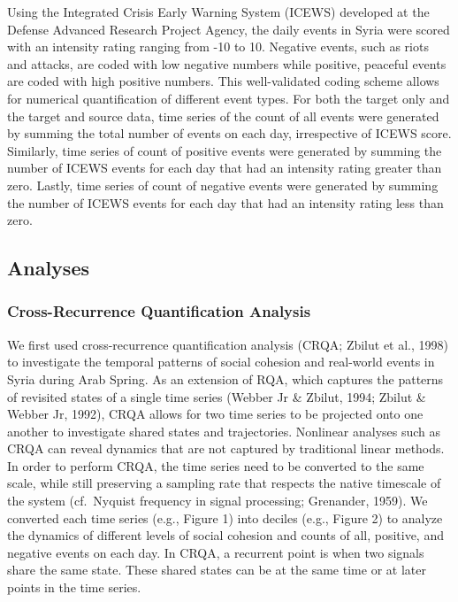 \documentclass[english,man]{apa6}
\begin{document}
Using the Integrated Crisis Early Warning System (ICEWS) developed at the Defense Advanced Research Project Agency, the daily events in Syria were scored with an intensity rating ranging from -10 to 10. Negative events, such as riots and attacks, are coded with low negative numbers while positive, peaceful events are coded with high positive numbers. This well-validated coding scheme allows for numerical quantification of different event types.
For both the target only and the target and source data, time series of the count of all events were generated by summing the total number of events on each day, irrespective of ICEWS score. Similarly, time series of count of positive events were generated by summing the number of ICEWS events for each day that had an intensity rating greater than zero. Lastly, time series of count of negative events were generated by summing the number of ICEWS events for each day that had an intensity rating less than zero.

\hypertarget{analyses}{%
\subsection{Analyses}\label{analyses}}

\hypertarget{cross-recurrence-quantification-analysis}{%
\subsubsection{Cross-Recurrence Quantification Analysis}\label{cross-recurrence-quantification-analysis}}

We first used cross-recurrence quantification analysis (CRQA; Zbilut et al., 1998) to investigate the temporal patterns of social cohesion and real-world events in Syria during Arab Spring. As an extension of RQA, which captures the patterns of revisited states of a single time series (Webber Jr \& Zbilut, 1994; Zbilut \& Webber Jr, 1992), CRQA allows for two time series to be projected onto one another to investigate shared states and trajectories. Nonlinear analyses such as CRQA can reveal dynamics that are not captured by traditional linear methods. In order to perform CRQA, the time series need to be converted to the same scale, while still preserving a sampling rate that respects the native timescale of the system (cf.~Nyquist frequency in signal processing; Grenander, 1959). We converted each time series (e.g., Figure 1) into deciles (e.g., Figure 2) to analyze the dynamics of different levels of social cohesion and counts of all, positive, and negative events on each day. In CRQA, a recurrent point is when two signals share the same state. These shared states can be at the same time or at later points in the time series.
\end{document}
